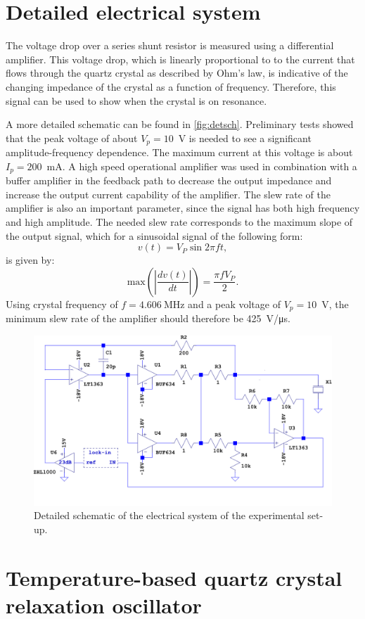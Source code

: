 \appendix

\clearpage\section{Detailed electrical system}
The voltage drop over a series shunt resistor is measured using a differential amplifier. This voltage drop, which is linearly proportional to to the current that flows through the quartz crystal as described by Ohm's law, is indicative of the changing impedance of the crystal as a function of frequency. Therefore, this signal can be used to show when the crystal is on resonance. 

A more detailed schematic can be found in \autoref{fig:detsch}. Preliminary tests showed that the peak voltage of about $V_{p}=10$~V is needed to see a significant amplitude-frequency dependence. The maximum current at this voltage is about $I_{p}=200$~mA. A high speed operational amplifier was used in combination with a buffer amplifier in the feedback path to decrease the output impedance and increase the output current capability of the amplifier. The slew rate of the amplifier is also an important parameter, since the signal has both high frequency and high amplitude. The needed slew rate corresponds to the maximum slope of the output signal, which for a sinusoidal signal of the following form:
\begin{equation}\label{eq:driving}
v(t) = V_{P} \sin{2\pi ft},
\end{equation}
is given by:
\begin{equation}\label{eq:slewrate}
\mbox{max}\left(\left|\frac{dv(t)}{dt}\right|\right) = \frac{\pi fV_{P}}{2}.
\end{equation}
Using crystal frequency of $f=\SI{4.606}{\mega\hertz}$ and a peak voltage of $V_{p}=10$~V, the minimum slew rate of the amplifier should therefore be \SI{425}{\volt/\micro\second}. 

\begin{figure}
	\centering
		\includegraphics[width=\textwidth]{figures/BUF634_paper.pdf}
	\caption{Detailed schematic of the electrical system of the experimental set-up. }
	\label{fig:detsch}
\end{figure}


\clearpage\section{Temperature-based quartz crystal relaxation oscillator}